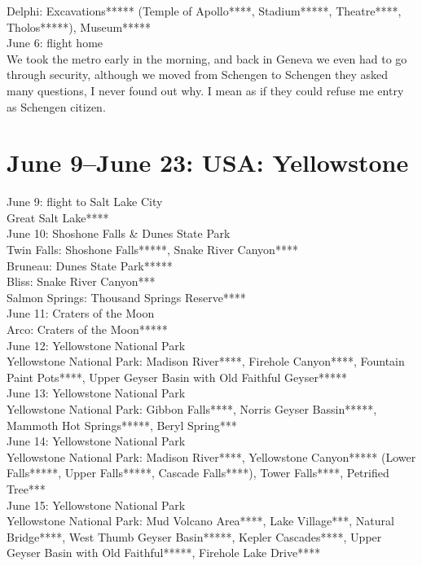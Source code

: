 Delphi: Excavations***** (Temple of Apollo****, Stadium*****, Theatre****, Tholos*****), Museum*****\\

June 6: flight home\\
We took the metro early in the morning, and back in Geneva we even had to go through security, although we moved from Schengen to Schengen they asked many questions, I never found out why. I mean as if they could refuse me entry as Schengen citizen.

\section{June 9--June 23: USA: Yellowstone}
\label{US2017}

June 9: flight to Salt Lake City\\
Great Salt Lake****\\

June 10: Shoshone Falls \& Dunes State Park\\
Twin Falls: Shoshone Falls*****, Snake River Canyon****\\
Bruneau: Dunes State Park*****\\
Bliss: Snake River Canyon***\\
Salmon Springs: Thousand Springs Reserve****\\

June 11: Craters of the Moon\\
Arco: Craters of the Moon*****\\

June 12: Yellowstone National Park\\
Yellowstone National Park: Madison River****, Firehole Canyon****, Fountain Paint Pots****, Upper Geyser Basin with Old Faithful Geyser*****\\

June 13: Yellowstone National Park\\
Yellowstone National Park: Gibbon Falls****, Norris Geyser Bassin*****, Mammoth Hot Springs*****, Beryl Spring***\\

June 14: Yellowstone National Park\\
Yellowstone National Park: Madison River****, Yellowstone Canyon***** (Lower Falls*****, Upper Falls*****, Cascade Falls****), Tower Falls****, Petrified Tree***\\

June 15: Yellowstone National Park\\
Yellowstone National Park: Mud Volcano Area****, Lake Village***, Natural Bridge****, West Thumb Geyser Basin*****, Kepler Cascades****, Upper Geyser Basin with Old Faithful*****, Firehole Lake Drive****\\

